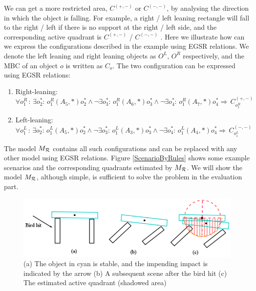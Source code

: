 \documentclass[letterpaper]{article}
\begin{document}
We can get a more restricted area, $C^{(+,-)}$ or $C^{(-,-)}$, by analysing the direction in which the object is falling. For example, a right / left leaning rectangle will fall to the right / left if there is no support at the right / left side, and the corresponding active quadrant is $C^{(+,-)}$ / $C^{(-, -)}$%
. Here we illustrate how can we express the configurations described in the example using EGSR relations. We denote the left leaning and right leaning objects as $O^L$, $O^R$ respectively, and the MBC of an object $o$ is written as $C_{o}$. The two configuration can be expressed using EGSR relations:
\begin{enumerate}
\item Right-leaning: $\forall o^R_1\,:\, \exists o^*_2:\,o^R_1 (A_5, *) o^*_2 \wedge\neg\exists o^*_3:\,o^R_1 (A_6, *) o^*_3 \wedge\neg\exists o^*_4:\,o^R_1 (A_7, *) o^*_4 \Rightarrow \, C_{o^R_1}^{(+,-)}$

\item Left-leaning: $\forall o^L_1\,:\, \exists o^*_2:\,o^L_1 (A_5, *) o^*_2 \wedge\neg\exists o^*_3:\,o^L_1 (A_3, *) o^*_3 \wedge\neg\exists o^*_4:\,o^L_1 (A_4, *) o^*_4 \Rightarrow \, C_{o^L_1}^{(-,-)}$
\end{enumerate}
The model $M_{\cal{R}}$ contains all such configurations and can be replaced with any other model using EGSR relations. Figure \ref{ScenarioByRules} shows some example scenarios and the corresponding quadrants estimated by $M_{\cal{R}}$. We will show the model $M_{\cal{R}}$, although simple, is sufficient to solve the problem in the evaluation part.  




\begin{figure}[t]
\centering\includegraphics[scale=0.28]{BirdImpact.png}
\vspace{-3mm}
\caption{(a) The object in cyan is stable, and the impending impact is indicated by the arrow (b) A subsequent scene after the bird hit (c) The estimated active quadrant (shadowed area)}
\label{BirdImpact}
\vspace{-3mm}
\end{figure}
\end{document}
